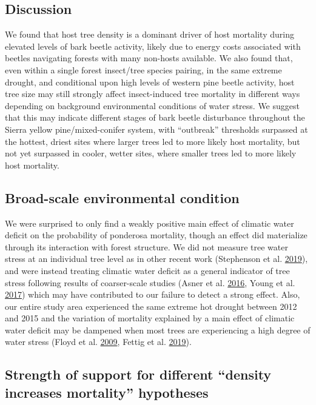 \documentclass[twoside,12pt,final]{ucthesis-CA2012}
\begin{document}
\begin{ucmainmatter}
\section{Discussion}\label{discussion-1}

We found that host tree density is a dominant driver of host mortality
during elevated levels of bark beetle activity, likely due to energy
costs associated with beetles navigating forests with many non-hosts
available. We also found that, even within a single forest insect/tree
species pairing, in the same extreme drought, and conditional upon high
levels of western pine beetle activity, host tree size may still
strongly affect insect-induced tree mortality in different ways
depending on background environmental conditions of water stress. We
suggest that this may indicate different stages of bark beetle
disturbance throughout the Sierra yellow pine/mixed-conifer system, with
``outbreak'' thresholds surpassed at the hottest, driest sites where
larger trees led to more likely host mortality, but not yet surpassed in
cooler, wetter sites, where smaller trees led to more likely host
mortality.

\subsection{Broad-scale environmental
condition}\label{broad-scale-environmental-condition}

We were surprised to only find a weakly positive main effect of climatic
water deficit on the probability of ponderosa mortality, though an
effect did materialize through its interaction with forest structure. We
did not measure tree water stress at an individual tree level as in
other recent work (Stephenson et al.
\protect\hyperlink{ref-stephenson2019}{2019}), and were instead treating
climatic water deficit as a general indicator of tree stress following
results of coarser-scale studies (Asner et al.
\protect\hyperlink{ref-asner2016}{2016}, Young et al.
\protect\hyperlink{ref-young2017}{2017}) which may have contributed to
our failure to detect a strong effect. Also, our entire study area
experienced the same extreme hot drought between 2012 and 2015 and the
variation of mortality explained by a main effect of climatic water
deficit may be dampened when most trees are experiencing a high degree
of water stress (Floyd et al. \protect\hyperlink{ref-floyd2009}{2009},
Fettig et al. \protect\hyperlink{ref-fettig2019}{2019}).

\subsection{\texorpdfstring{Strength of support for different ``density
increases mortality''
hypotheses}{Strength of support for different density increases mortality hypotheses}}\label{strength-of-support-for-different-density-increases-mortality-hypotheses}


\end{ucmainmatter}
\end{document}

